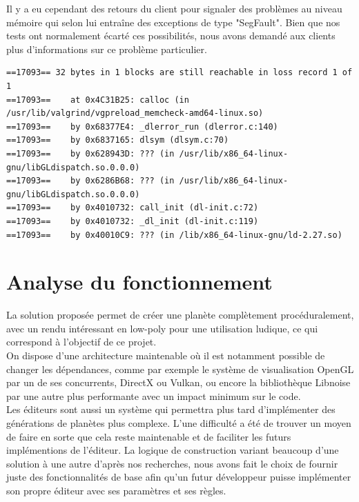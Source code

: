 \documentclass[a4paper]{article}
\begin{document}
Il y a eu cependant des retours du client pour signaler des problèmes au niveau mémoire qui selon lui entraîne des exceptions de type "SegFault". Bien que nos tests ont normalement écarté ces possibilités, nous avons demandé aux clients plus d'informations sur ce problème particulier.

\newpage
\begin{lstlisting}[caption= Extrait de la commande valgrind \\ 
\label{exmem}
\texttt{valgrind --leak-check=full --show-leak-kinds=all --log-file="../tests\_result/valgrind\_tests.txt" ./unit\_tests}]
==17093== 32 bytes in 1 blocks are still reachable in loss record 1 of 1
==17093==    at 0x4C31B25: calloc (in /usr/lib/valgrind/vgpreload_memcheck-amd64-linux.so)
==17093==    by 0x68377E4: _dlerror_run (dlerror.c:140)
==17093==    by 0x6837165: dlsym (dlsym.c:70)
==17093==    by 0x628943D: ??? (in /usr/lib/x86_64-linux-gnu/libGLdispatch.so.0.0.0)
==17093==    by 0x6286B68: ??? (in /usr/lib/x86_64-linux-gnu/libGLdispatch.so.0.0.0)
==17093==    by 0x4010732: call_init (dl-init.c:72)
==17093==    by 0x4010732: _dl_init (dl-init.c:119)
==17093==    by 0x40010C9: ??? (in /lib/x86_64-linux-gnu/ld-2.27.so)
\end{lstlisting}

\newpage
\section{Analyse du fonctionnement}

La solution proposée permet de créer une planète complètement procéduralement, avec un rendu intéressant en low-poly pour une utilisation ludique, ce qui correspond à l'objectif de ce projet.\\

On dispose d'une architecture maintenable où il est notamment possible de changer les dépendances, comme par exemple le système de visualisation OpenGL par un de ses concurrents, DirectX ou Vulkan, ou encore la bibliothèque Libnoise par une autre plus performante avec un impact minimum sur le code.\\

Les éditeurs sont aussi un système qui permettra plus tard d'implémenter des générations de planètes plus complexe. L'une difficulté a été de trouver un moyen de faire en sorte que cela reste maintenable et de faciliter les futurs implémentions de l'éditeur. La logique de construction variant beaucoup d'une solution à une autre d'après nos recherches, nous avons fait le choix de fournir juste des fonctionnalités de base afin qu'un futur développeur puisse implémenter son propre éditeur avec ses paramètres et ses règles.\\
\end{document}
